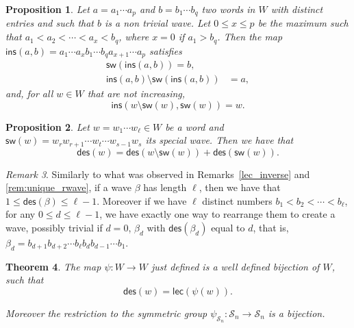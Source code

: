 \documentclass[10pt,a4paper]{amsart}
\newcommand{\des}{\mathsf{des}}
\newcommand{\lec}{\mathsf{lec}}
\newcommand{\sw}{\mathsf{sw}}
\newcommand{\ins}{\mathsf{ins}}
\newtheorem{theorem}{Theorem}[section]
\newtheorem{proposition}[theorem]{Proposition}
\theoremstyle{definition}
\theoremstyle{remark}
\newtheorem{remark}[theorem]{Remark}
\numberwithin{equation}{section}
\begin{document}
\setcounter{section}{5}
\setcounter{equation}{4}
\setcounter{manualconjinner}{0}
\setcounter{manualtheoreminner}{0}
\setcounter{theorem}{5}
\begin{proposition}\label{prop:inv}
Let $a=a_1\cdots a_p$ and $b=b_1\cdots b_q$ two words in $W$ with distinct entries and such that $b$ is a non trivial wave. Let $0\leq x\leq p$ be the maximum such that $a_1<a_2<\cdots<a_x<b_q$, where $x=0$ if $a_1>b_q$. Then the map $\ins(a,b)=a_1\cdots a_xb_1\cdots b_qa_{x+1}\cdots a_p$ satisfies
\begin{align}\label{eq:ins1}
    \sw(\ins(a,b))=b,\\
    \ins(a,b)\setminus\sw(\ins(a,b))&=a,\label{eq:ins2}
\end{align}
and, for all $w\in W$ that are not increasing,
\begin{equation}\label{eq:ins3}
    \ins(w\setminus\sw(w),\sw(w))=w.
\end{equation}
\end{proposition}

\setcounter{section}{5}
\setcounter{equation}{7}
\setcounter{manualconjinner}{0}
\setcounter{manualtheoreminner}{0}
\setcounter{theorem}{7}
\begin{proposition}\label{prop:des_spezza}
Let $w=w_1\cdots w_{\ell}\in W$ be a word and $\sw(w)=w_rw_{r+1}\cdots w_t\cdots w_{s-1}w_s$ its special wave. Then we have that
\begin{equation}\label{eq:des_spezza}
\des(w)=\des(w\setminus\sw(w))+\des(\sw(w)).
\end{equation}   
\end{proposition}

\setcounter{section}{5}
\setcounter{equation}{9}
\setcounter{manualconjinner}{0}
\setcounter{manualtheoreminner}{0}
\setcounter{theorem}{9}
\begin{remark}\label{rem:unique_wave}
Similarly to what was observed in Remarks~\ref{lec_inverse} and \ref{rem:unique_rwave}, if a wave $\beta$ has length $\ell $, then we have that $1\leq\des(\beta)\leq\ell-1$. Moreover if we have $\ell$ distinct numbers $b_1<b_2<\cdots<b_{\ell}$, for any $0\leq d\leq\ell-1$, we have exactly one way to rearrange them to create a wave, possibly trivial if $d=0$, $\beta_d$ with $\des(\beta_d)$ equal to $d$, that is, ${\beta_d=b_{d+1}b_{d+2}\cdots b_{\ell}b_db_{d-1}\cdots b_1}$.
\end{remark}

\setcounter{section}{5}
\setcounter{equation}{10}
\setcounter{manualconjinner}{0}
\setcounter{manualtheoreminner}{0}
\setcounter{theorem}{10}
\begin{theorem}\label{thm:bijection}
    The map $\psi:W\to W$ just defined is a well defined bijection of $W$, such that \begin{equation}
        \des(w)=\lec(\psi(w)).\label{eq:des_lec}
        \end{equation}

    Moreover the restriction to the symmetric group $\psi_{\mathcal{S}_n}:\mathcal{S}_n\to \mathcal{S}_n$ is a bijection.
\end{theorem}
\end{document}
